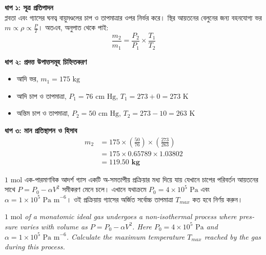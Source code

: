 \documentclass[12pt, a4paper]{article}
\begin{document}
\begin{tcolorbox}[solutionbox={সমাধান (Solution)}]
    \noindent
    \textbf{ধাপ ১: সূত্র প্রতিপাদন} \\
    প্লবতা এবং গ্যাসের ঘনত্ব বায়ুমণ্ডলের চাপ ও তাপমাত্রার ওপর নির্ভর করে। স্থির আয়তনের বেলুনের জন্য বহনযোগ্য ভর $m \propto \rho \propto \frac{P}{T}$। অতএব, অনুপাত থেকে পাই:
    \[ \frac{m_2}{m_1} = \frac{P_2}{P_1} \times \frac{T_1}{T_2} \]
    
    \vspace{0.4em}
    \noindent\textbf{ধাপ ২: প্রদত্ত উপাত্তসমূহ চিহ্নিতকরণ}
    \begin{itemize}[leftmargin=1.5em, itemsep=0.2em]
        \item আদি ভর, $m_1 = 175\text{ kg}$
        \item আদি চাপ ও তাপমাত্রা, $P_1 = 76\text{ cm Hg}$, $T_1 = 273 + 0 = 273\text{ K}$
        \item অন্তিম চাপ ও তাপমাত্রা, $P_2 = 50\text{ cm Hg}$, $T_2 = 273 - 10 = 263\text{ K}$
    \end{itemize}
    
    \vspace{0.4em}
    \noindent\textbf{ধাপ ৩: মান প্রতিস্থাপন ও হিসাব}
    \begin{align*}
        m_2 &= 175 \times \left(\frac{50}{76}\right) \times \left(\frac{273}{263}\right) \\
        &= 175 \times 0.65789 \times 1.03802 \\
        &= \mathbf{119.50\text{ kg}}
    \end{align*}
\end{tcolorbox}

\vspace{2em}

\begin{tcolorbox}[questionbox={প্রশ্ন (Question) 17}]
    \noindent
    $1\text{ mol}$ এক-পারমাণবিক আদর্শ গ্যাস একটি অ-সমতাপীয় প্রক্রিয়ার মধ্য দিয়ে যায় যেখানে চাপের পরিবর্তন আয়তনের সাথে $P = P_0 - \alpha V^2$ সমীকরণ মেনে চলে। এখানে যথাক্রমে $P_0 = 4 \times 10^5\text{ Pa}$ এবং $\alpha = 1 \times 10^5\text{ Pa m}^{-6}$। ওই প্রক্রিয়ায় গ্যাসের অর্জিত সর্বোচ্চ তাপমাত্রা $T_{max}$ কত হবে নির্ণয় করুন।
    
    \vspace{0.8em}
    \begin{english}
    \noindent\textit{\color{darkgray}
    $1\text{ mol}$ of a monatomic ideal gas undergoes a non-isothermal process where pressure varies with volume as $P = P_0 - \alpha V^2$. Here $P_0 = 4 \times 10^5\text{ Pa}$ and $\alpha = 1 \times 10^5\text{ Pa m}^{-6}$. Calculate the maximum temperature $T_{max}$ reached by the gas during this process.
    }
    \end{english}
\end{tcolorbox}
\end{document}
